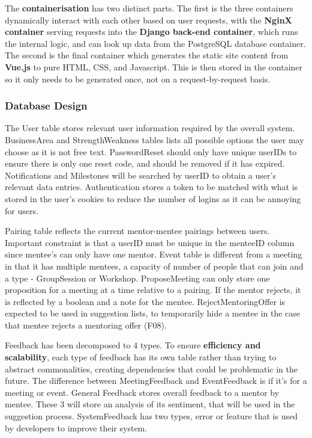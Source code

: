 \documentclass[10pt]{article}
\begin{document}
The \textbf{containerisation} has two distinct parts. The first is the three
containers dynamically interact with each other based on user requests, with the
\textbf{NginX container} serving requests into the \textbf{Django back-end
container}, which runs the internal logic, and can look up data from the
PostgreSQL database container. The second is the final container which generates
the static site content from \textbf{Vue.js} to pure HTML, CSS, and Javascript.
This is then stored in the container so it only needs to be generated once, not
on a request-by-request basis.

\subsubsection{Database Design}

The User table stores relevant user information required by the overall system.
BusinessArea and StrengthWeakness tables lists all possible options the user may
choose as it is not free text. PasswordReset should only have unique userIDs to
ensure there is only one reset code, and should be removed if it has expired.
Notifications and Milestones will be searched by userID to obtain a user's
relevant data entries. Authentication stores a token to be matched with what is
stored in the user's cookies to reduce the number of logins as it can be
annoying for users.

Pairing table reflects the current mentor-mentee pairings between users.
Important constraint is that a userID must be unique in the menteeID column
since mentee's can only have one mentor. Event table is different from a meeting
in that it has multiple mentees, a capacity of number of people that can join
and a type - GroupSession or Workshop. ProposeMeeting can only store one
proposition for a meeting at a time relative to a pairing. If the mentor
rejects, it is reflected by a boolean and a note for the mentee.
RejectMentoringOffer is expected to be used in suggestion lists, to temporarily
hide a mentee in the case that mentee rejects a mentoring offer (F08).

Feedback has been decomposed to 4 types. To ensure \textbf{efficiency
and scalability}, each type of feedback has its own table rather than trying to
abstract commonalities, creating dependencies that could be problematic in the
future. The difference between MeetingFeedback and EventFeedback is if it's for
a meeting or event. General Feedback stores overall feedback to a mentor by
mentee. These 3 will store an analysis of its sentiment, that will be used in
the suggestion process. SystemFeedback has two types, error or feature that is
used by developers to improve their system.
\end{document}
